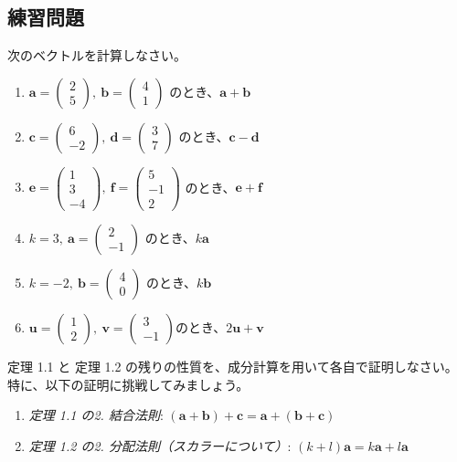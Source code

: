 \subsection{練習問題}
\begin{quiz}
次のベクトルを計算しなさい。
\begin{enumerate}
\item $\bm{a} = \begin{pmatrix} 2 \\ 5 \end{pmatrix},\ \bm{b} = \begin{pmatrix} 4 \\ 1 \end{pmatrix}$ のとき、$\bm{a} + \bm{b}$
\item $\bm{c} = \begin{pmatrix} 6 \\ -2 \end{pmatrix},\ \bm{d} = \begin{pmatrix} 3 \\ 7 \end{pmatrix}$ のとき、$\bm{c} - \bm{d}$
\item $\bm{e} = \begin{pmatrix} 1 \\ 3 \\ -4 \end{pmatrix},\ \bm{f} = \begin{pmatrix} 5 \\ -1 \\ 2 \end{pmatrix}$ のとき、$\bm{e} + \bm{f}$
\item $k = 3,\ \bm{a} = \begin{pmatrix} 2 \\ -1 \end{pmatrix}$ のとき、$k\bm{a}$
\item $k = -2,\ \bm{b} = \begin{pmatrix} 4 \\ 0 \end{pmatrix}$ のとき、$k\bm{b}$
\item $\bm{u} = \begin{pmatrix} 1 \\ 2 \end{pmatrix},\ \bm{v} = \begin{pmatrix} 3 \\ -1 \end{pmatrix}$のとき、$2\bm{u} + \bm{v}$
\end{enumerate}
\end{quiz}

\begin{quiz}[定理の証明演習]
定理 1.1 と 定理 1.2 の残りの性質を、成分計算を用いて各自で証明しなさい。
特に、以下の証明に挑戦してみましょう。
\begin{enumerate}
\item \emph{定理 1.1 の2. 結合法則}: $(\bm{a} + \bm{b}) + \bm{c} = \bm{a} + (\bm{b} + \bm{c})$
\item \emph{定理 1.2 の2. 分配法則（スカラーについて）}: $(k+l)\bm{a} = k\bm{a} + l\bm{a}$
\end{enumerate}
\end{quiz}